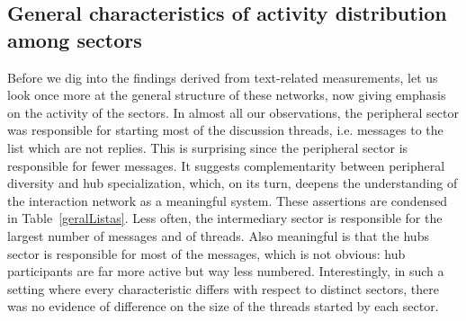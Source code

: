 																																							\subsection{General characteristics of activity distribution among sectors}\label{sec:gen}
																																							Before we dig into the findings derived from text-related measurements,
																																							let us look once more at the general structure of these networks,
																																							now giving emphasis on the activity of the sectors.
																																							In almost all our observations,
																																							the peripheral sector was responsible for starting most of the discussion threads,
																																							i.e. messages to the list which are not replies.
																																							This is surprising since the peripheral sector is responsible for fewer messages. It suggests complementarity between peripheral diversity and hub specialization, which, on its turn, deepens the understanding of the interaction network as a meaningful system. 
																																							These assertions are condensed in Table~\ref{geralListas}.
																																							Less often, the intermediary sector is responsible for the largest number of messages and of threads.
																																							Also meaningful is that the hubs sector is responsible for most of the messages, which is not obvious: hub participants are far more active but way less numbered. Interestingly, in such a setting where every characteristic differs with respect to
																																							distinct sectors, there was no evidence of difference on the size of the threads started by each sector.
																																							


